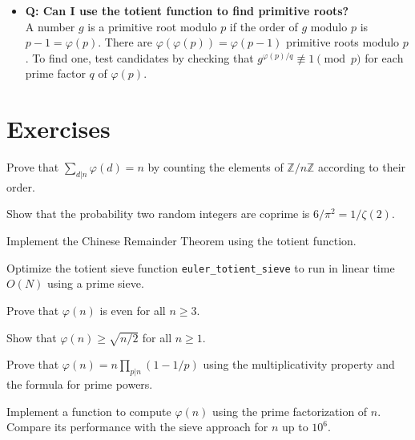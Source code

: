 \begin{itemize}
\item \textbf{Q: Can I use the totient function to find primitive roots?} \\
A number $g$ is a primitive root modulo $p$ if the order of $g$ modulo $p$ is $p-1 = \varphi(p)$. There are $\varphi(\varphi(p)) = \varphi(p-1)$ primitive roots modulo $p$. To find one, test candidates by checking that $g^{\varphi(p)/q} \not\equiv 1 \pmod{p}$ for each prime factor $q$ of $\varphi(p)$.
\end{itemize}

\section{Exercises}

\begin{exercise}
Prove that $\sum_{d|n} \varphi(d) = n$ by counting the elements of $\mathbb{Z}/n\mathbb{Z}$ according to their order.
\end{exercise}

\begin{exercise}
Show that the probability two random integers are coprime is $6/\pi^2 = 1/\zeta(2)$.
\end{exercise}

\begin{exercise}
Implement the Chinese Remainder Theorem using the totient function.
\end{exercise}

\begin{exercise}[Computational]
Optimize the totient sieve function \texttt{euler\_totient\_sieve} to run in linear time $O(N)$ using a prime sieve.
\end{exercise}

\begin{exercise}
Prove that $\varphi(n)$ is even for all $n \geq 3$.
\end{exercise}

\begin{exercise}
Show that $\varphi(n) \geq \sqrt{n/2}$ for all $n \geq 1$.
\end{exercise}

\begin{exercise}
Prove that $\varphi(n) = n \prod_{p|n} (1 - 1/p)$ using the multiplicativity property and the formula for prime powers.
\end{exercise}

\begin{exercise}[Computational]
Implement a function to compute $\varphi(n)$ using the prime factorization of $n$. Compare its performance with the sieve approach for $n$ up to $10^6$.
\end{exercise}

